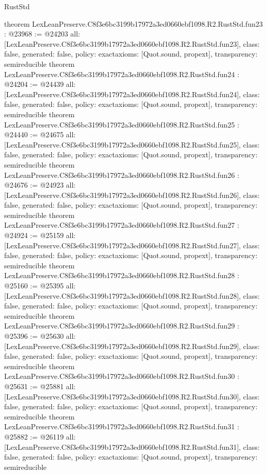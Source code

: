 \begin{lexlean}{RustStd}
\begin{coremodule}
{}
theorem LexLeanPreserve.C8f3e6bc3199b17972a3ed0660ebf1098.R2.RustStd.fun23 : @23968 := @24203 {
  all: [LexLeanPreserve.C8f3e6bc3199b17972a3ed0660ebf1098.R2.RustStd.fun23],
  class: false,
  generated: false,
  policy: exact{axioms: [Quot.sound, propext]},
  transparency: semireducible
}
theorem LexLeanPreserve.C8f3e6bc3199b17972a3ed0660ebf1098.R2.RustStd.fun24 : @24204 := @24439 {
  all: [LexLeanPreserve.C8f3e6bc3199b17972a3ed0660ebf1098.R2.RustStd.fun24],
  class: false,
  generated: false,
  policy: exact{axioms: [Quot.sound, propext]},
  transparency: semireducible
}
theorem LexLeanPreserve.C8f3e6bc3199b17972a3ed0660ebf1098.R2.RustStd.fun25 : @24440 := @24675 {
  all: [LexLeanPreserve.C8f3e6bc3199b17972a3ed0660ebf1098.R2.RustStd.fun25],
  class: false,
  generated: false,
  policy: exact{axioms: [Quot.sound, propext]},
  transparency: semireducible
}
theorem LexLeanPreserve.C8f3e6bc3199b17972a3ed0660ebf1098.R2.RustStd.fun26 : @24676 := @24923 {
  all: [LexLeanPreserve.C8f3e6bc3199b17972a3ed0660ebf1098.R2.RustStd.fun26],
  class: false,
  generated: false,
  policy: exact{axioms: [Quot.sound, propext]},
  transparency: semireducible
}
theorem LexLeanPreserve.C8f3e6bc3199b17972a3ed0660ebf1098.R2.RustStd.fun27 : @24924 := @25159 {
  all: [LexLeanPreserve.C8f3e6bc3199b17972a3ed0660ebf1098.R2.RustStd.fun27],
  class: false,
  generated: false,
  policy: exact{axioms: [Quot.sound, propext]},
  transparency: semireducible
}
theorem LexLeanPreserve.C8f3e6bc3199b17972a3ed0660ebf1098.R2.RustStd.fun28 : @25160 := @25395 {
  all: [LexLeanPreserve.C8f3e6bc3199b17972a3ed0660ebf1098.R2.RustStd.fun28],
  class: false,
  generated: false,
  policy: exact{axioms: [Quot.sound, propext]},
  transparency: semireducible
}
theorem LexLeanPreserve.C8f3e6bc3199b17972a3ed0660ebf1098.R2.RustStd.fun29 : @25396 := @25630 {
  all: [LexLeanPreserve.C8f3e6bc3199b17972a3ed0660ebf1098.R2.RustStd.fun29],
  class: false,
  generated: false,
  policy: exact{axioms: [Quot.sound, propext]},
  transparency: semireducible
}
theorem LexLeanPreserve.C8f3e6bc3199b17972a3ed0660ebf1098.R2.RustStd.fun30 : @25631 := @25881 {
  all: [LexLeanPreserve.C8f3e6bc3199b17972a3ed0660ebf1098.R2.RustStd.fun30],
  class: false,
  generated: false,
  policy: exact{axioms: [Quot.sound, propext]},
  transparency: semireducible
}
theorem LexLeanPreserve.C8f3e6bc3199b17972a3ed0660ebf1098.R2.RustStd.fun31 : @25882 := @26119 {
  all: [LexLeanPreserve.C8f3e6bc3199b17972a3ed0660ebf1098.R2.RustStd.fun31],
  class: false,
  generated: false,
  policy: exact{axioms: [Quot.sound, propext]},
  transparency: semireducible
}
\end{coremodule}
\end{lexlean}
